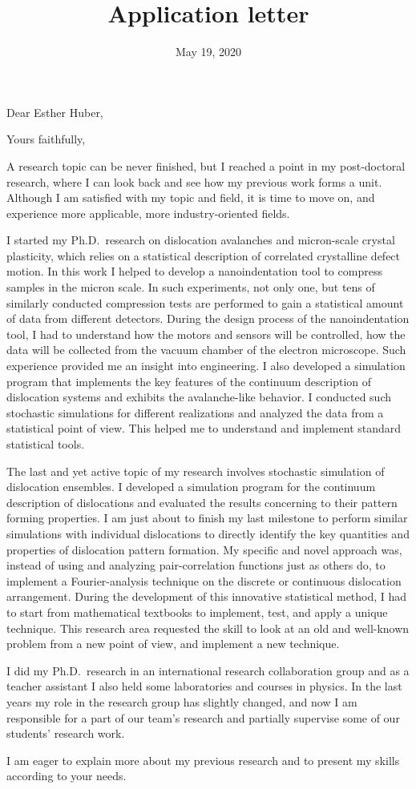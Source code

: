 \documentclass[11pt,a4paper,sans]{moderncv}        %
\title{Application letter}                               %
\begin{document}
\date{May 19, 2020}
\opening{Dear Esther Huber,}
\closing{Yours faithfully,}
\makelettertitle

A research topic can be never finished, but I reached a point in my post-doctoral research, where I can look back and see how my previous work forms a unit. Although I am satisfied with my topic and field, it is time to move on, and experience more applicable, more industry-oriented fields.

I started my Ph.D.\ research on dislocation avalanches and micron-scale crystal plasticity, which relies on a statistical description of correlated crystalline defect motion. In this work I helped to develop a nanoindentation tool to compress samples in the micron scale. In such experiments, not only one, but tens of similarly conducted compression tests are performed to gain a statistical amount of data from different detectors. During the design process of the nanoindentation tool, I had to understand how the motors and sensors will be controlled, how the data will be collected from the vacuum chamber of the electron microscope. Such experience provided me an insight into engineering. I also developed a simulation program that implements the key features of the continuum description of dislocation systems and exhibits the avalanche-like behavior. I conducted such stochastic simulations for different realizations and analyzed the data from a statistical point of view. This helped me to understand and implement standard statistical tools.

The last and yet active topic of my research involves stochastic simulation of dislocation ensembles. I developed a simulation program for the continuum description of dislocations and evaluated the results concerning to their pattern forming properties. I am just about to finish my last milestone to perform similar simulations with individual dislocations to directly identify the key quantities and properties of dislocation pattern formation. My specific and novel approach was, instead of using and analyzing pair-correlation functions just as others do, to implement a Fourier-analysis technique on the discrete or continuous dislocation arrangement. During the development of this innovative statistical method, I had to start from mathematical textbooks to implement, test, and apply a unique technique. This research area requested the skill to look at an old and well-known problem from a new point of view, and implement a new technique.

I did my Ph.D.\ research in an international research collaboration group and as a teacher assistant I also held some laboratories and courses in physics. In the last years my role in the research group has slightly changed, and now I am responsible for a part of our team’s research and partially supervise some of our students’ research work.

I am eager to explain more about my previous research and to present my skills according to your needs.

\makeletterclosing
\end{document}
